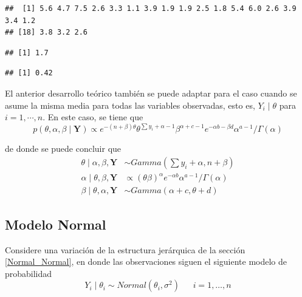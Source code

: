 \begin{knitrout}
\begin{kframe}
\begin{verbatim}
##  [1] 5.6 4.7 7.5 2.6 3.3 1.1 3.9 1.9 1.9 2.5 1.8 5.4 6.0 2.6 3.9 3.4 1.2
## [18] 3.8 3.2 2.6
\end{verbatim}
\begin{alltt}
 \hlstd{(res.alpha[}\hlopt{-}\hlstd{(}\hlopt{:}\hlopt{/}\hlstd{))])}
\end{alltt}
\begin{verbatim}
## [1] 1.7
\end{verbatim}
\begin{alltt}
 \hlstd{(res.beta[}\hlopt{-}\hlstd{(}\hlopt{:}\hlopt{/}\hlstd{))])}
\end{alltt}
\begin{verbatim}
## [1] 0.42
\end{verbatim}
\end{kframe}
\end{knitrout}

El anterior desarrollo teórico también se puede adaptar para el caso cuando se asume la misma media para todas las variables observadas, esto es, $Y_i\mid\theta$ para $i=1,\cdots,n$. En este caso, se tiene que 
\begin{equation*}
p(\theta,\alpha,\beta\mid\mathbf{Y})\propto e^{-(n+\beta)\theta}\theta^{\sum y_i+\alpha-1}\beta^{\alpha+c-1}e^{-\alpha b-\beta d}\alpha^{a-1}/\Gamma(\alpha)
\end{equation*}

de donde se puede concluir que 
\begin{align}
\theta\mid\alpha,\beta,\mathbf{Y}&\sim Gamma(\sum y_i+\alpha,n+\beta)\label{Poisson_Gamma1}\\
\alpha\mid\theta,\beta,\mathbf{Y}&\propto(\theta\beta)^\alpha e^{-\alpha b}\alpha^{a-1}/\Gamma(\alpha)\label{Poisson_Gamma2}\\
\beta\mid\theta,\alpha,\mathbf{Y}&\sim Gamma(\alpha+c,\theta+d)\label{Poisson_Gamma3}
\end{align}

\subsection{Modelo Normal}
Considere una variación de la estructura jerárquica de la sección \ref{Normal_Normal}, en donde las observaciones siguen el siguiente modelo de probabilidad
\begin{equation*}
Y_i \mid \theta_i \sim Normal(\theta_i,\sigma^2) \ \ \ \ \ \ \ i=1,\ldots,n
\end{equation*}

